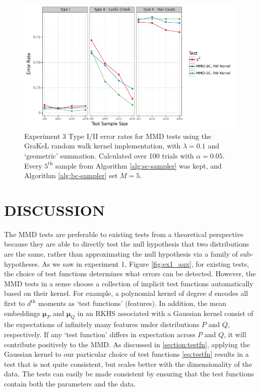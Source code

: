 \documentclass[a4paper,12pt]{article}
\begin{document}
\begin{figure}[H]
    \centering
    \includegraphics[width=\textwidth]{figures/graph_random_walk.png}
    \caption{Experiment 3 Type I/II error rates for MMD tests using the GraKeL \cite{siglidis_grakel_2020} random walk kernel implementation, with $\lambda=0.1$ and `geometric' summation. Calculated over 100 trials with $\alpha=0.05$. Every $5^{\text{th}}$ sample from Algorithm \ref{alg:sc-sampler} was kept, and Algorithm \ref{alg:bc-sampler} set $M=5$.}
    \label{fig:ex3_rw}
\end{figure}

\section{DISCUSSION}
\label{section:discussion}
The MMD tests are preferable to existing tests from a theoretical perspective because they are able to directly test the null hypothesis that two distributions are the same, rather than approximating the null hypothesis via a family of sub-hypotheses. As we saw in experiment 1, Figure \ref{fig:ex1_aux}, for existing tests, the choice of test functions determines what errors can be detected. However, the MMD tests in a sense choose a collection of implicit test functions automatically based on their kernel. For example, a polynomial kernel of degree $d$ encodes all first to $d^{\text{th}}$ moments as `test functions' (features). In addition, the mean embeddings $\mathbf{\mu}_{P}$ and $\mathbf{\mu}_{Q}$ in an RKHS associated with a Gaussian kernel consist of the expectations of infinitely many features under distributions $P$ and $Q$, respectively. If any `test function' differs in expectation across $P$ and $Q$, it will contribute positively to the MMD. As discussed in \ref{section:testfn}, applying the Gaussian kernel to our particular choice of test functions \eqref{eq:testfn} results in a test that is not quite consistent, but scales better with the dimensionality of the data. The tests can easily be made consistent by ensuring that the test functions contain both the parameters and the data.
\end{document}
